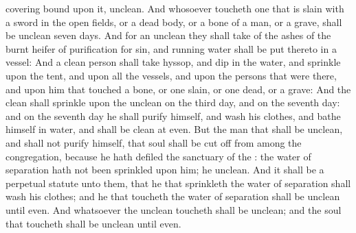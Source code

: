 {covering
bound upon it,
{}
unclean.
And whosoever
toucheth one that is
slain with a
sword in the
open
fields, or a dead
body, or a
bone of a
man, or a
grave, shall be
unclean
seven
days.
And for an
unclean
{} they shall
take of the
ashes of the burnt
heifer of purification for
sin, and
running
water shall be
put thereto in a
vessel:
And a
clean
person shall
take
hyssop, and
dip
{} in the
water, and
sprinkle
{} upon the
tent, and upon all the
vessels, and upon the
persons that were there, and upon him that
touched a
bone, or one
slain, or one
dead, or a
grave:
And the
clean
{} shall
sprinkle upon the
unclean on the
third
day, and on the
seventh
day: and on the
seventh
day he shall
purify himself, and
wash his
clothes, and
bathe himself in
water, and shall be
clean at
even.
But the
man that shall be
unclean, and shall not
purify himself, that
soul shall be cut
off from
among the
congregation, because he hath
defiled the
sanctuary of the
{}: the
water of
separation hath not been
sprinkled upon him; he
{}
unclean.
And it shall be a
perpetual
statute unto them, that he that
sprinkleth the
water of
separation shall
wash his
clothes; and he that
toucheth the
water of
separation shall be
unclean until
even.
And whatsoever the
unclean
{}
toucheth shall be
unclean; and the
soul that
toucheth
{} shall be
unclean until
even.

}
